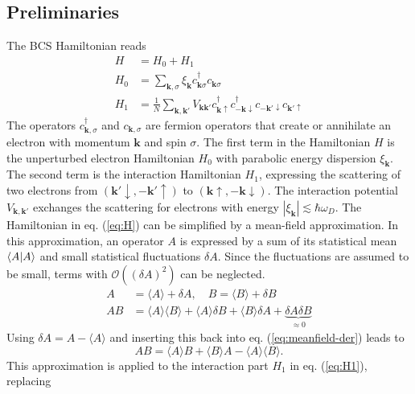 \subsection*{Preliminaries}
The BCS Hamiltonian reads 
\begin{align}
H &= H_0 + H_1 \label{eq:H}\\
H_0 &= \sum_{\mathbf{k}, \sigma} \xi_{\mathbf{k}} c^{\dagger}_{\mathbf{k} \sigma }c_{\mathbf{k} \sigma }  \label{eq:H0}\\
H_1 &= \frac{1}{N} \sum_{\mathbf{k}, \mathbf{k'}} V_\mathbf{{\mathbf{k} \mathbf{k'}}} c^{\dagger}_{\mathbf{k} \uparrow }c^{\dagger}_{- \mathbf{k} \downarrow}   c_{- \mathbf{k'} \downarrow} c_{\mathbf{k'} \uparrow} \label{eq:H1}
\end{align}
The operators $c^\dagger_{\mathbf{k}, \sigma}$ and $c_{\mathbf{k}, \sigma}$ are fermion operators that create or annihilate an electron with momentum $\mathbf{k}$ and spin $\sigma$. The first term in the Hamiltonian $H$ is the unperturbed electron Hamiltonian $H_0$ with parabolic energy dispersion $\xi_{\mathbf{k}}$. The  second term is the interaction Hamiltonian $H_1$, expressing the scattering of two electrons from $(\mathbf{k'} \downarrow,  - \mathbf{k'} \uparrow)$ to $(\mathbf{k} \uparrow , - \mathbf{k} \downarrow)$. The interaction potential $V_\mathbf{{\mathbf{k}, \mathbf{k'}}}$ exchanges the scattering for electrons with energy $|\xi_\mathbf{k}| \lesssim \hbar \omega_D$.
The Hamiltonian in eq. (\ref{eq:H}) can be simplified by a mean-field approximation. In this approximation, an operator $A$ is expressed by a sum of its statistical mean $\braket{A}$ and small statistical fluctuations $\delta A$. Since the fluctuations are assumed to be small, terms with $\mathcal{O}((\delta A)^2)$ can be neglected.
\begin{align}
A &= \langle A \rangle + \delta A, \quad B = \langle B \rangle + \delta B  \nonumber \\
A B &= \langle A \rangle  \langle B \rangle  + \langle A \rangle  \delta B +  \langle B \rangle \delta A + \underbrace{\delta A \delta B}_{\approx 0}\label{eq:meanfield-der}
\end{align}
Using $\delta A = A - \langle A \rangle$ and inserting this back into eq. (\ref{eq:meanfield-der}) leads to
\begin{equation}
AB = \langle A \rangle B + \langle B \rangle A - \langle A \rangle \langle B \rangle.\label{eq:meanfield-ab}
\end{equation}
This approximation is applied to the interaction part $H_1$ in eq. (\ref{eq:H1}), replacing
